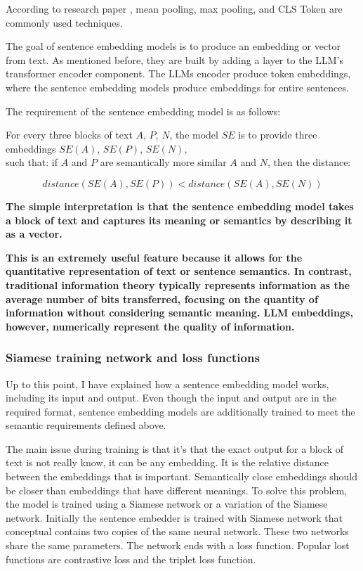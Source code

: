 \documentclass{wseas}
\begin{document}
According to research paper \cite{sbert}, mean
pooling, max pooling, and CLS Token are commonly used techniques.

The goal of sentence embedding models is to produce an embedding or
vector from text. As mentioned before, they are built by adding a layer
to the LLM's transformer encoder component. The LLMs encoder produce token
embeddings, where the sentence embedding models produce embeddings for
entire sentences.

The requirement of the sentence embedding model is as follows:

For every three blocks of text \(A\), \(P\), \(N\), the model \(SE\) is
to provide three embeddings \(SE(A)\), \(SE(P)\), \(SE(N)\),\\
such that: if \(A\) and \(P\) are semantically more similar \(A\) and
\(N\), then the distance: 

\begin{equation}
   distance(SE(A), SE(P)) < distance(SE(A), SE(N))
\end{equation}

\textbf{The simple interpretation is that the sentence embedding model
takes a block of text and captures its meaning or semantics by
describing it as a vector.}

\textbf{This is an extremely useful feature because it allows for the 
quantitative representation of text or sentence semantics. In contrast, 
traditional information theory typically represents information as the 
average number of bits transferred, focusing on the quantity of information 
without considering semantic meaning. LLM embeddings, however, numerically 
represent the quality of information.}

\subsubsection{Siamese training network and loss functions}

Up to this point, I have explained how a sentence embedding model works,
including its input and output. Even though the input and output are in
the required format, sentence embedding models are additionally trained
to meet the semantic requirements defined above.

The main issue during training is that it's that the exact output for a 
block of text is not really know, it can be any embedding. It is the relative
distance between the embeddings that is important. Semantically close
embeddings should be closer than embeddings that have different
meanings. To solve this problem, the model is trained using a Siamese
network or a variation of the Siamese network. Initially the sentence
embedder is trained with Siamese network that conceptual contains two
copies of the same neural network. These two networks share the same
parameters. The network ends with a loss function. Popular lost
functions are contrastive loss and the triplet loss function.
\end{document}
